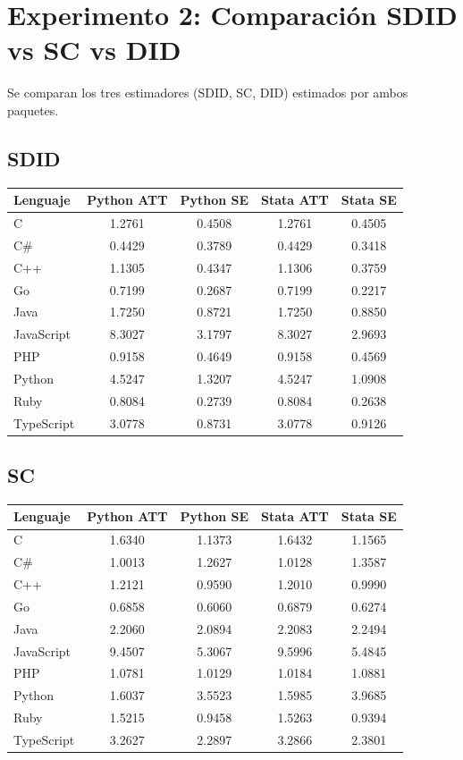 \documentclass[12pt,a4paper]{article}
\begin{document}
\section{Experimento 2: Comparaci\'on SDID vs SC vs DID}

Se comparan los tres estimadores (SDID, SC, DID) estimados por ambos paquetes.

\subsection*{SDID}
\begin{tabular}{lcccc}
\toprule
Lenguaje & \textcolor{pyblue}{Python ATT} & \textcolor{pyblue}{Python SE} & \textcolor{statagreen}{Stata ATT} & \textcolor{statagreen}{Stata SE} \\
\midrule
  C & 1.2761 & 0.4508 & 1.2761 & 0.4505 \\
  C\# & 0.4429 & 0.3789 & 0.4429 & 0.3418 \\
  C++ & 1.1305 & 0.4347 & 1.1306 & 0.3759 \\
  Go & 0.7199 & 0.2687 & 0.7199 & 0.2217 \\
  Java & 1.7250 & 0.8721 & 1.7250 & 0.8850 \\
  JavaScript & 8.3027 & 3.1797 & 8.3027 & 2.9693 \\
  PHP & 0.9158 & 0.4649 & 0.9158 & 0.4569 \\
  Python & 4.5247 & 1.3207 & 4.5247 & 1.0908 \\
  Ruby & 0.8084 & 0.2739 & 0.8084 & 0.2638 \\
  TypeScript & 3.0778 & 0.8731 & 3.0778 & 0.9126 \\
\bottomrule
\end{tabular}

\subsection*{SC}
\begin{tabular}{lcccc}
\toprule
Lenguaje & \textcolor{pyblue}{Python ATT} & \textcolor{pyblue}{Python SE} & \textcolor{statagreen}{Stata ATT} & \textcolor{statagreen}{Stata SE} \\
\midrule
  C & 1.6340 & 1.1373 & 1.6432 & 1.1565 \\
  C\# & 1.0013 & 1.2627 & 1.0128 & 1.3587 \\
  C++ & 1.2121 & 0.9590 & 1.2010 & 0.9990 \\
  Go & 0.6858 & 0.6060 & 0.6879 & 0.6274 \\
  Java & 2.2060 & 2.0894 & 2.2083 & 2.2494 \\
  JavaScript & 9.4507 & 5.3067 & 9.5996 & 5.4845 \\
  PHP & 1.0781 & 1.0129 & 1.0184 & 1.0881 \\
  Python & 1.6037 & 3.5523 & 1.5985 & 3.9685 \\
  Ruby & 1.5215 & 0.9458 & 1.5263 & 0.9394 \\
  TypeScript & 3.2627 & 2.2897 & 3.2866 & 2.3801 \\
\bottomrule
\end{tabular}
\end{document}
